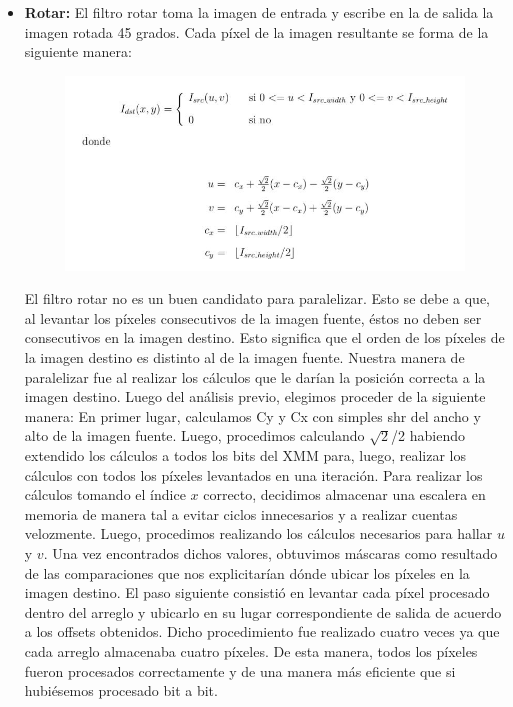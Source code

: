 \documentclass[10pt, a4paper]{article}
\begin{document}
\begin{itemize}
\item {\textbf{Rotar:}} 
El filtro rotar toma la imagen de entrada y escribe en la de salida la imagen rotada 45 grados. Cada píxel de la imagen resultante se forma de la siguiente manera:
\begin{figure}[H] %
\begin{center}
\includegraphics[width=400pt]{./rotar.jpg}
\end{center}
\end{figure}
El filtro rotar no es un buen candidato para paralelizar. Esto se debe a que, al levantar los píxeles consecutivos de la imagen fuente, éstos no deben ser consecutivos en la imagen destino. Esto significa que el orden de los píxeles de la imagen destino es distinto al de la imagen fuente. Nuestra manera de paralelizar fue al realizar los cálculos que le darían la posición correcta a la imagen destino.\newline
Luego del análisis previo, elegimos proceder de la siguiente manera:\newline
En primer lugar, calculamos Cy y Cx con simples shr del ancho y alto de la imagen fuente. Luego, procedimos calculando $\sqrt{2}$/2 habiendo extendido los cálculos a todos los bits del XMM para, luego, realizar los cálculos con todos los píxeles levantados en una iteración.\newline
Para realizar los cálculos tomando el índice $x$ correcto, decidimos almacenar una escalera en memoria de manera tal a evitar ciclos innecesarios y a realizar cuentas velozmente.\newline
Luego, procedimos realizando los cálculos necesarios para hallar $u$ y $v$. Una vez encontrados dichos valores, obtuvimos máscaras como resultado de las comparaciones que nos explicitarían dónde ubicar los píxeles en la imagen destino.\newline
El paso siguiente consistió en levantar cada píxel procesado dentro del arreglo y ubicarlo en su lugar correspondiente de salida de acuerdo a los offsets obtenidos. Dicho procedimiento fue realizado cuatro veces ya que cada arreglo almacenaba cuatro píxeles. De esta manera, todos los píxeles fueron procesados correctamente y de una manera más eficiente que si hubiésemos procesado bit a bit.\newline

\end{itemize}
\end{document}
